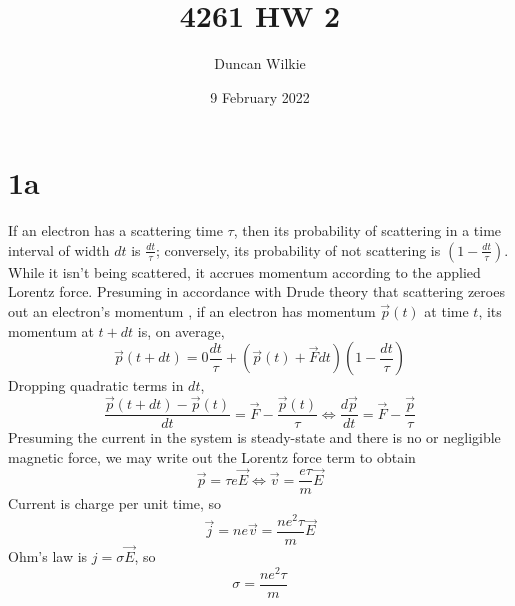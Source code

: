 \documentclass{article}
\title{4261 HW 2}
\author{Duncan Wilkie}
\date{9 February 2022}
\begin{document}
\maketitle

\section*{1a}
If an electron has a scattering time $\tau$, then its probability of scattering in a time interval of width $dt$ is $\frac{dt}{\tau}$; conversely, its probability of not scattering is $(1-\frac{dt}{\tau})$. While it isn't being scattered, it accrues momentum according to the applied Lorentz force. Presuming in accordance with Drude theory that scattering zeroes out an electron's momentum , if an electron has momentum $\vec{p}(t)$ at time $t$, its momentum at $t+dt$ is, on average,
\[\vec{p}(t+dt)=0\frac{dt}{\tau}+(\vec{p}(t)+\vec{F}dt)\left( 1-\frac{dt}{\tau} \right)\]
Dropping quadratic terms in $dt$,
\[\frac{\vec{p}(t+dt)-\vec{p}(t)}{dt}=\vec{F}-\frac{\vec{p}(t)}{\tau}\Leftrightarrow \frac{d\vec{p}}{dt}=\vec{F}-\frac{\vec{p}}{\tau}\]
Presuming the current in the system is steady-state and there is no or negligible magnetic force, we may write out the Lorentz force term to obtain
\[\vec{p}=\tau e\vec{E}\Leftrightarrow \vec{v}=\frac{e\tau}{m}\vec{E}\]
Current is charge per unit time, so
\[\vec{j}=ne\vec{v}=\frac{ne^2\tau}{m}\vec{E}\]
Ohm's law is $j=\sigma\vec{E}$, so
\[\sigma=\frac{ne^2\tau}{m}\]
\end{document}
